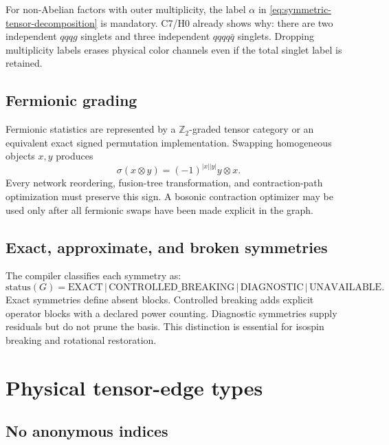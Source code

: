 \documentclass[11pt]{article}
\begin{document}
For non-Abelian factors with outer multiplicity, the label \(\alpha\) in
\cref{eq:symmetric-tensor-decomposition} is mandatory.  C7/H0 already shows why:
there are two independent \(qqqg\) singlets and three independent
\(qqqq\bar q\) singlets.  Dropping multiplicity labels erases physical color
channels even if the total singlet label is retained.

\subsection{Fermionic grading}

Fermionic statistics are represented by a \(\mathbb Z_2\)-graded tensor
category or an equivalent exact signed permutation implementation.  Swapping
homogeneous objects \(x,y\) produces
\begin{equation}
 \sigma(x\otimes y)
 =(-1)^{|x||y|}y\otimes x.
\label{eq:graded-swap}
\end{equation}
Every network reordering, fusion-tree transformation, and contraction-path
optimization must preserve this sign.  A bosonic contraction optimizer may be
used only after all fermionic swaps have been made explicit in the graph.

\subsection{Exact, approximate, and broken symmetries}

The compiler classifies each symmetry as:
\begin{equation}
 \mathrm{status}(G)=
 \mathrm{EXACT}\,|\,
 \mathrm{CONTROLLED\_BREAKING}\,|\,
 \mathrm{DIAGNOSTIC}\,|\,
 \mathrm{UNAVAILABLE}.
\label{eq:symmetry-status}
\end{equation}
Exact symmetries define absent blocks.  Controlled breaking adds explicit
operator blocks with a declared power counting.  Diagnostic symmetries supply
residuals but do not prune the basis.  This distinction is essential for
isospin breaking and rotational restoration.

\section{Physical tensor-edge types}
\label{sec:edge-types}

\subsection{No anonymous indices}
\end{document}
